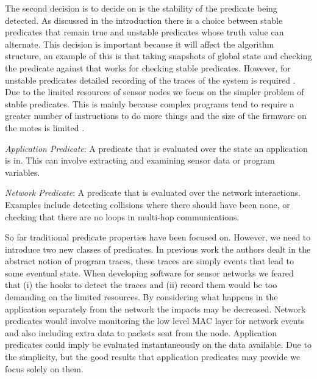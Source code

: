 The second decision is to decide on is the stability of the predicate being detected. As discussed in the introduction there is a choice between stable predicates that remain true and unstable predicates whose truth value can alternate. This decision is important because it will affect the algorithm structure, an example of this is that taking snapshots of global state and checking the predicate against that works for checking stable predicates. However, for unstable predicates detailed recording of the traces of the system is required \cite{bansod2004distributed}. Due to the limited resources of sensor nodes we focus on the simpler problem of stable predicates. This is mainly because complex programs tend to require a greater number of instructions to do more things and the size of the firmware on the motes is limited \cite{CM5000}.


\begin{mydef}
\emph{Application Predicate}: A predicate that is evaluated over the state an application is in. This can involve extracting and examining sensor data or program variables.
\end{mydef}

\begin{mydef}
\emph{Network Predicate}: A predicate that is evaluated over the network interactions. Examples include detecting collisions where there should have been none, or checking that there are no loops in multi-hop communications.
\end{mydef}

So far traditional predicate properties have been focused on. However, we need to introduce two new classes of predicates. In previous work the authors dealt in the abstract notion of program traces, these traces are simply events that lead to some eventual state. When developing software for sensor networks we feared that (i) the hooks to detect the traces and (ii) record them would be too demanding on the limited resources. By considering what happens in the application separately from the network the impacts may be decreased. Network predicates would involve monitoring the low level MAC layer for network events and also including extra data to packets sent from the node. Application predicates could imply be evaluated instantaneously on the data available. Due to the simplicity, but the good results that application predicates may provide we focus solely on them.

